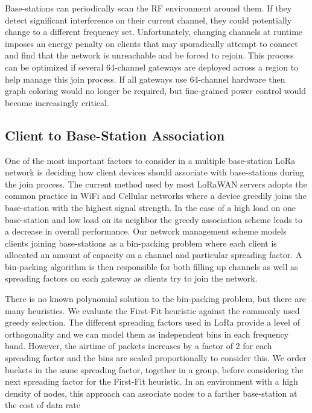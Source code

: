 Base-stations can periodically scan the RF environment around them.  If they detect significant interference on their current channel, they could potentially change to a different frequency set.  Unfortunately, changing channels at runtime imposes an energy penalty on clients that may sporadically attempt to connect and find that the network is unreachable and be forced to rejoin.  This process can be optimized if several 64-channel gateways are deployed across a region to help manage this join process.  If all gateways use 64-channel hardware then graph coloring would no longer be required, but fine-grained power control would become increasingly critical.




\subsection{Client to Base-Station Association}
\label{sec:bs-assoc}

One of the most important factors to consider in a multiple base-station LoRa network is deciding how client devices should associate with base-stations during the join process.  The current method used by most LoRaWAN servers adopts the common practice in WiFi and Cellular networks where a device greedily joins the base-station with the highest signal strength.
In the case of a high load on one base-station and low load on its neighbor the greedy association scheme leads to a decrease in overall performance.
Our network management scheme models clients joining base-stations as a bin-packing problem where each client is allocated an amount of capacity on a channel and particular spreading factor.  A bin-packing algorithm is then responsible for both filling up channels as well as spreading factors on each gateway as clients try to join the network.

There is no known polynomial solution to the bin-packing problem, but there are many heuristics.  We evaluate the First-Fit heuristic against the commonly used greedy selection. The different spreading factors used in LoRa provide a level of orthogonality and we can model them as independent bins in each frequency band. However, the airtime of packets increases by a factor of 2 for each spreading factor and the bins are scaled proportionally to consider this. We order buckets in the same spreading factor, together in a group, before considering the next spreading factor for the First-Fit heuristic. In an environment with a high density of nodes, this approach can associate nodes to a farther base-station at the cost of data rate


